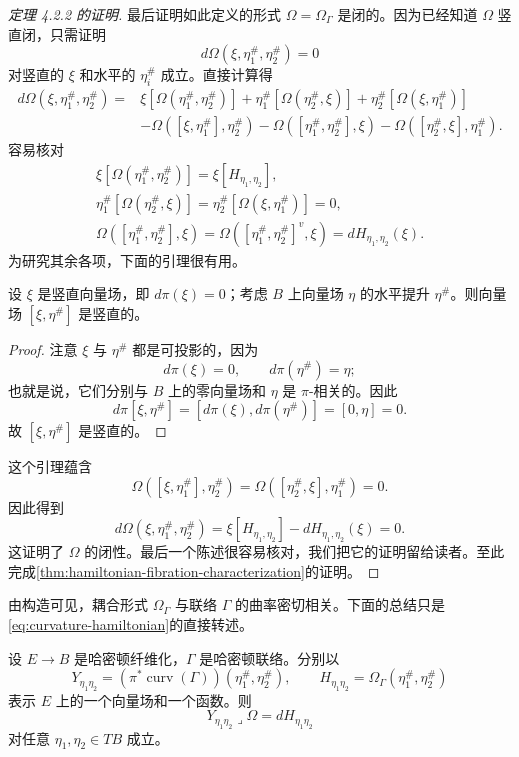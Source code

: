 \begin{proof}[定理 4.2.2 的证明]
最后证明如此定义的形式 $\Omega=\Omega_\Gamma$ 是闭的。因为已经知道
$\Omega$ 竖直闭，只需证明
\[
 d\Omega(\xi,\eta_1^\#,\eta_2^\#)=0
\]
对竖直的 $\xi$ 和水平的 $\eta_i^\#$ 成立。直接计算得
\[
\begin{aligned}
 d\Omega(\xi,\eta_1^\#,\eta_2^\#)
 ={}&\xi[\Omega(\eta_1^\#,\eta_2^\#)]
 +\eta_1^\#[\Omega(\eta_2^\#,\xi)]
 +\eta_2^\#[\Omega(\xi,\eta_1^\#)]\\
 &-\Omega([\xi,\eta_1^\#],\eta_2^\#)
  -\Omega([\eta_1^\#,\eta_2^\#],\xi)
  -\Omega([\eta_2^\#,\xi],\eta_1^\#).
\end{aligned}
\]
容易核对
\[
\begin{gathered}
 \xi[\Omega(\eta_1^\#,\eta_2^\#)]=\xi[H_{\eta_1,\eta_2}],\\
 \eta_1^\#[\Omega(\eta_2^\#,\xi)]
 =\eta_2^\#[\Omega(\xi,\eta_1^\#)]=0,\\
 \Omega([\eta_1^\#,\eta_2^\#],\xi)
 =\Omega([\eta_1^\#,\eta_2^\#]^v,\xi)
 =dH_{\eta_1,\eta_2}(\xi).
\end{gathered}
\]
为研究其余各项，下面的引理很有用。

\begin{lemma}\label{lem:vertical-horizontal-bracket}
设 $\xi$ 是竖直向量场，即 $d\pi(\xi)=0$；考虑 $B$ 上向量场
$\eta$ 的水平提升 $\eta^\#$。则向量场 $[\xi,\eta^\#]$ 是竖直的。
\end{lemma}

\begin{proof}
注意 $\xi$ 与 $\eta^\#$ 都是可投影的，因为
\[
 d\pi(\xi)=0,
 \qquad d\pi(\eta^\#)=\eta;
\]
也就是说，它们分别与 $B$ 上的零向量场和 $\eta$ 是 $\pi$-相关的。因此
\[
 d\pi[\xi,\eta^\#]
 =[d\pi(\xi),d\pi(\eta^\#)]=[0,\eta]=0.
\]
故 $[\xi,\eta^\#]$ 是竖直的。
\end{proof}

这个引理蕴含
\[
 \Omega([\xi,\eta_1^\#],\eta_2^\#)
 =\Omega([\eta_2^\#,\xi],\eta_1^\#)=0.
\]
因此得到
\[
 d\Omega(\xi,\eta_1^\#,\eta_2^\#)
 =\xi[H_{\eta_1,\eta_2}]-dH_{\eta_1,\eta_2}(\xi)=0.
\]
这证明了 $\Omega$ 的闭性。最后一个陈述很容易核对，我们把它的证明留给读者。至此完成\cref{thm:hamiltonian-fibration-characterization}的证明。
\end{proof}

由构造可见，耦合形式 $\Omega_\Gamma$ 与联络 $\Gamma$ 的曲率密切相关。下面的总结只是\eqref{eq:curvature-hamiltonian}的直接转述。

\begin{theorem}\label{thm:coupling-form-curvature}
设 $E\to B$ 是哈密顿纤维化，$\Gamma$ 是哈密顿联络。分别以
\[
 Y_{\eta_1\eta_2}
 =(\pi^*\operatorname{curv}(\Gamma))(\eta_1^\#,\eta_2^\#),
 \qquad
 H_{\eta_1\eta_2}=\Omega_\Gamma(\eta_1^\#,\eta_2^\#)
\]
表示 $E$ 上的一个向量场和一个函数。则
\begin{equation}
 Y_{\eta_1\eta_2}\mathbin\lrcorner\Omega=dH_{\eta_1\eta_2}
 \label{eq:coupling-curvature-hamiltonian}
\end{equation}
对任意 $\eta_1,\eta_2\in TB$ 成立。
\end{theorem}

